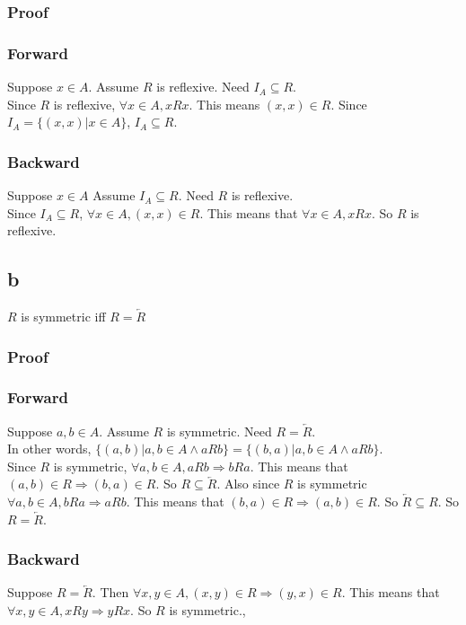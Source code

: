 \documentclass{article}
\begin{document}
\subsubsection*{Proof}
\subsubsection*{Forward}
Suppose $x \in A$. 
Assume $R$ is reflexive. 
Need $I_A \subseteq R$.\\
Since $R$ is reflexive, $\forall x \in A, xRx$. This means $(x, x) \in R$. Since $I_A = \{(x, x) | x \in A\}$, $I_A \subseteq R$.
\subsubsection*{Backward}
Suppose $x \in A$
Assume $I_A \subseteq R$.
Need $R$ is reflexive.\\
Since $I_A \subseteq R$, $\forall x \in A, (x, x) \in R$. This means that $\forall x \in A, xRx$. So $R$ is reflexive.
\subsection*{b}
$R$ is symmetric iff $R = \overleftarrow{R}$
\subsubsection*{Proof}
\subsubsection*{Forward}
Suppose $a, b \in A$.
Assume $R$ is symmetric.
Need $R = \overleftarrow{R}$.\\
In other words, $\{(a, b) | a, b \in A \land aRb\} = \{(b, a) | a, b \in A \land aRb\}$.\\
Since $R$ is symmetric, $\forall a, b \in A, aRb \Rightarrow bRa$. This means that $(a, b) \in R \Rightarrow (b, a) \in R$. So $R \subseteq \overleftarrow{R}$. Also since $R$ is symmetric $\forall a, b \in A, bRa \Rightarrow aRb$. This means that $(b, a) \in R \Rightarrow (a, b) \in R$. So $\overleftarrow{R} \subseteq R$. So $R = \overleftarrow{R}$.

\subsubsection*{Backward}
Suppose $R = \overleftarrow{R}$. Then $\forall x, y \in A, (x, y) \in R \Rightarrow (y, x) \in R$. This means that $\forall x, y \in A, xRy \Rightarrow yRx$. So $R$ is symmetric.,
\end{document}
